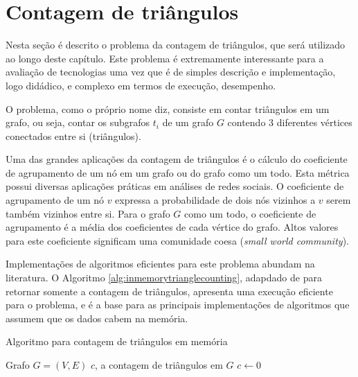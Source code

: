 \section{Contagem de triângulos} 
\label{sec:triangulos}

Nesta seção é descrito o problema da contagem de triângulos, que será utilizado
ao longo deste capítulo. Este problema é extremamente interessante para a avaliação de 
tecnologias uma vez que é de simples descrição e implementação, logo didádico, e complexo
em termos de execução, desempenho.

O problema, como o próprio nome diz, consiste em contar triângulos em um grafo, ou seja,
contar os subgrafos $t_i$ de um grafo $G$ contendo 3 diferentes vértices conectados entre si 
(triângulos). 

Uma das grandes aplicações da contagem de triângulos é o cálculo do coeficiente de agrupamento 
de um nó em um grafo ou do grafo como um todo. Esta métrica possui diversas aplicações práticas 
em análises de redes sociais. O coeficiente de agrupamento de um nó $v$ expressa a probabilidade de 
dois nós vizinhos a $v$ serem também vizinhos entre si. Para o grafo $G$ como um todo, o coeficiente 
de agrupamento é a média dos coeficientes de cada vértice do grafo. Altos valores para este coeficiente 
significam uma comunidade coesa (\emph{small world community}).

Implementações de algoritmos eficientes para este problema abundam na literatura. O Algoritmo 
\ref{alg:inmemorytrianglecounting}, adapdado de \citep{Chu2012} para retornar somente a contagem de 
triângulos, apresenta uma execução eficiente para o problema, e é a base para as principais 
implementações de algoritmos que assumem que os dados cabem na memória. 

\begin{algorithm}
\caption{Algoritmo para contagem de triângulos em memória}
\label{alg:inmemorytrianglecounting}
\begin{algorithmic}[1]
    \REQUIRE Grafo $G = (V, E)$
    \ENSURE $c$, a contagem de triângulos em $G$
    \STATE $c \leftarrow 0$
            \ENDFOR
        \ENDFOR
    \ENDFOR 
\end{algorithmic}
\end{algorithm}

